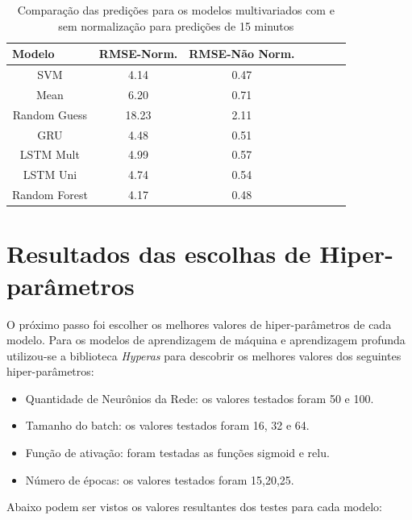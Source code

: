 \begin{table}[H]
    \caption{Comparação das predições para os modelos multivariados com e sem normalização para predições de 15 minutos}
    \label{table:RmseComparison}
    \begin{center}
    \begin{tabular}{ccccccc}
    \hline
    \multicolumn{1}{l}{\textbf{Modelo}} & \multicolumn{1}{l}{\textbf{RMSE-Norm.}} & \multicolumn{1}{l}{\textbf{RMSE-Não Norm.}}\\
    \hline
    SVM & 4.14 & 0.47  \\
    Mean & 6.20 & 0.71  \\
    Random Guess & 18.23 & 2.11\\
    GRU & 4.48 & 0.51  \\ 
    LSTM Mult & 4.99 &  0.57  \\ 
    LSTM Uni & 4.74 &  0.54  \\ 
    Random Forest & 4.17 & 0.48 \\
    \hline
    \end{tabular}
    \end{center}
\end{table}

\section{Resultados das escolhas de Hiper-parâmetros}

O próximo passo foi escolher os melhores valores de hiper-parâmetros de cada modelo. Para os modelos de aprendizagem de máquina e aprendizagem profunda utilizou-se a biblioteca \textit{Hyperas} para descobrir os melhores valores dos seguintes hiper-parâmetros:

\begin{itemize}
	\item Quantidade de Neurônios da Rede: os valores testados foram 50 e 100.
	\item Tamanho do batch: os valores testados foram 16, 32 e 64.
	\item Função de ativação: foram testadas as funções sigmoid e relu.
	\item Número de épocas: os valores testados foram 15,20,25.
\end{itemize}

Abaixo podem ser vistos os valores resultantes dos testes para cada modelo:

